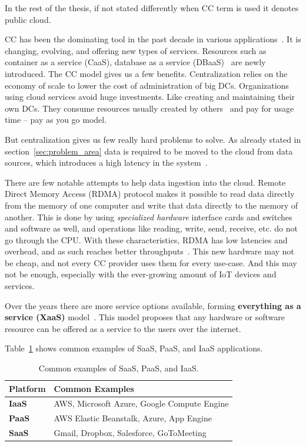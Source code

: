 \noindent
In the rest of the thesis, if not stated differently when CC term is used it denotes public cloud.

CC has been the dominating tool in the past decade in various applications~\cite{Satyanarayanan17}. It is changing, evolving, and offering new types of services. Resources such as container as a service (CaaS), database as a service (DBaaS)~\cite{Peter} are newly introduced. The CC model gives us a few benefits. Centralization relies on the economy of scale to lower the cost of administration of big DCs. Organizations using cloud services avoid huge investments. Like creating and maintaining their own DCs. They consume resources usually created by others~\cite{Satyanarayanan17} and pay for usage time -- pay as you go model. 

But centralization gives us few really hard problems to solve. As already stated in section~\ref{sec:problem_area} data is required to be moved to the cloud from data sources, which introduces a high latency in the system~\cite{HossainRH18}. 

There are few notable attempts to help data ingestion into the cloud. Remote Direct Memory Access (RDMA) protocol makes it possible to read data directly from the memory of one computer and write that data directly to the memory of another. This is done by using \textit{specialized hardware} interface cards and switches and software as well, and operations like reading, write, send, receive, etc. do not go through the CPU. With these characteristics, RDMA has low latencies and overhead, and as such reaches better throughputs~\cite{CohenTKCKRCDG09}. This new hardware may not be cheap, and not every CC provider uses them for every use-case. And this may not be enough, especially with the ever-growing amount of IoT devices and services.

Over the years there are more service options available, forming \textbf{everything as a service (XaaS)} model~\cite{DuanFZSNH15}. This model proposes that any hardware or software resource can be offered as a service to the users over the internet.

Table~\ref{tab:table2} shows common examples of SaaS, PaaS, and IaaS applications.

\begin{table}[h!]
	\begin{center}
		\begin{tabular}{l|l}
			\textbf{Platform} & \textbf{Common Examples}\\
			\hline
			\textbf{IaaS} & AWS, Microsoft Azure, Google Compute Engine \\
			\textbf{PaaS} & AWS Elastic Beanstalk, Azure, App Engine \\
			\textbf{SaaS} & Gmail, Dropbox, Salesforce, GoToMeeting \\
		\end{tabular}
	\end{center}
	\vspace{-0.5cm}
	\caption{Common examples of SaaS, PaaS, and IaaS.}
	\label{tab:table2}
\end{table}


